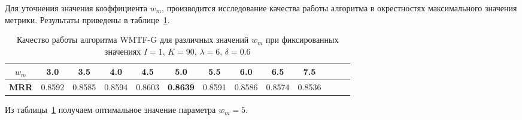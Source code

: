     Для уточнения значения коэффициента $w_m$, производится исследование качества работы алгоритма в окрестностях максимального значения метрики.
    Результаты приведены в таблице~\ref{tabular:wtmfg_test4}.
    \begin{table}[h!]
        \caption{Качество работы алгоритма WMTF-G для различных значений $w_m$ при фиксированных значениях $I=1$, $K=90$, $\lambda=6$, $\delta=0.6$ \bigskip}
        \centering

        \label{tabular:wtmfg_test4}
        \begin{tabular}{|c|c|c|c|c|c|c|c|c|c|c|c|c|} \hline
            $w_m$ & 3.0 & 3.5 & 4.0 & 4.5 & 5.0 & 5.5 & 6.0 & 6.5 & 7.5 \\ \hline
            \bf{MRR} & 0.8592 & 0.8585 & 0.8594 & 0.8603 & \bf{0.8639} & 0.8591 & 0.8586 & 0.8574 & 0.8536 \\ \hline

        \end{tabular}
    \end{table}
    Из таблицы~\ref{tabular:wtmfg_test4} получаем оптимальное значение параметра $w_m=5$.

